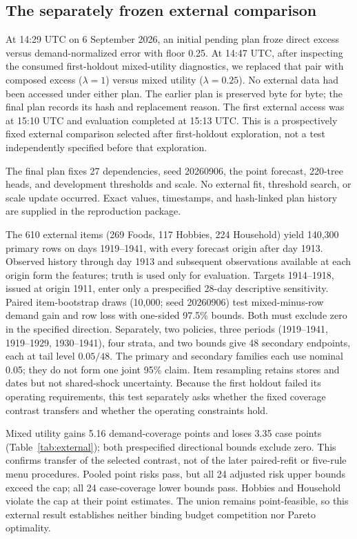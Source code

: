 \subsection{The separately frozen external comparison}
\label{app:external}
At 14:29 UTC on 6 September 2026, an initial pending plan froze direct excess versus demand-normalized error with floor 0.25. At 14:47 UTC, after inspecting the consumed first-holdout mixed-utility diagnostics, we replaced that pair with composed excess ($\lambda=1$) versus mixed utility ($\lambda=0.25$). No external data had been accessed under either plan. The earlier plan is preserved byte for byte; the final plan records its hash and replacement reason. The first external access was at 15:10 UTC and evaluation completed at 15:13 UTC. This is a prospectively fixed external comparison selected after first-holdout exploration, not a test independently specified before that exploration.

The final plan fixes 27 dependencies, seed 20260906, the point forecast, 220-tree heads, and development thresholds and scale. No external fit, threshold search, or scale update occurred. Exact values, timestamps, and hash-linked plan history are supplied in the reproduction package.

The 610 external items (269 Foods, 117 Hobbies, 224 Household) yield 140,300 primary rows on days 1919--1941, with every forecast origin after day 1913. Observed history through day 1913 and subsequent observations available at each origin form the features; truth is used only for evaluation. Targets 1914--1918, issued at origin 1911, enter only a prespecified 28-day descriptive sensitivity. Paired item-bootstrap draws (10,000; seed 20260906) test mixed-minus-row demand gain and row loss with one-sided 97.5\% bounds. Both must exclude zero in the specified direction. Separately, two policies, three periods (1919--1941, 1919--1929, 1930--1941), four strata, and two bounds give 48 secondary endpoints, each at tail level $0.05/48$. The primary and secondary families each use nominal 0.05; they do not form one joint 95\% claim. Item resampling retains stores and dates but not shared-shock uncertainty. Because the first holdout failed its operating requirements, this test separately asks whether the fixed coverage contrast transfers and whether the operating constraints hold.


\label{sec:external}\label{sec:heldout}
Mixed utility gains 5.16 demand-coverage points and loses 3.35 case points (Table~\ref{tab:external}); both prespecified directional bounds exclude zero. This confirms transfer of the selected contrast, not of the later paired-refit or five-rule menu procedures. Pooled point risks pass, but all 24 adjusted risk upper bounds exceed the cap; all 24 case-coverage lower bounds pass. Hobbies and Household violate the cap at their point estimates. The union remains point-feasible, so this external result establishes neither binding budget competition nor Pareto optimality.

